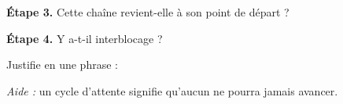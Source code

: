 \bigskip

\textbf{Étape 3.} Cette chaîne revient-elle à son point de départ ?

\medskip
\begin{center}
 \qquad {}
\end{center}

\bigskip

\textbf{Étape 4.} Y a-t-il interblocage ?

\medskip
\begin{center}
 \qquad {}
\end{center}

\medskip
Justifie en une phrase : \dotfill

\medskip
\textit{Aide :} un cycle d'attente signifie qu'aucun ne pourra jamais avancer.
